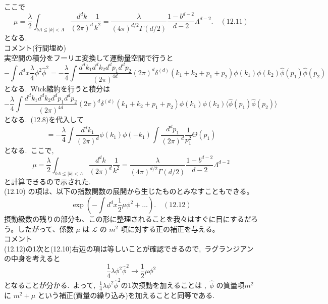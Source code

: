 \documentclass[uplatex,dvipdfmx]{jsarticle}
\begin{document}
ここで
\begin{equation}
    \mu = \frac{\lambda}{2} \int_{b\Lambda \le |k| < \Lambda} \frac{d^d k}{(2\pi)^d} \frac{1}{k^2} = \frac{\lambda}{(4\pi)^{d/2} \Gamma(d/2)} \frac{1 - b^{d-2}}{d-2} \Lambda^{d-2}. \quad (12.11)
\end{equation}
となる.\\
コメント(行間埋め)\\
実空間の積分をフーリエ変換して運動量空間で行うと
\begin{equation}
    - \int d^d x \frac{\lambda}{4} \phi^2 \hat{\phi}^2 = -\frac{\lambda}{4} \int \frac{d^d k_1 d^d k_2 d^d p_1 d^d p_2}{(2\pi)^{4d}} (2\pi)^d \delta^{(d)}(k_1+k_2+p_1+p_2) \phi(k_1)\phi(k_2)\hat{\phi}(p_1)\hat{\phi}(p_2)
\end{equation}
となる.~Wick縮約を行うと積分は
\begin{equation}
    -\frac{\lambda}{4} \int \frac{d^d k_1 d^d k_2 d^d p_1 d^d p_2}{(2\pi)^{4d}} (2\pi)^d \delta^{(d)}(k_1+k_2+p_1+p_2) \phi(k_1)\phi(k_2) \langle \hat{\phi}(p_1) \hat{\phi}(p_2) \rangle
\end{equation}
となる.~(12.8)を代入して
\begin{equation}
    = -\frac{\lambda}{4} \int \frac{d^d k_1}{(2\pi)^d} \phi(k_1)\phi(-k_1) \int \frac{d^d p_1}{(2\pi)^d} \frac{1}{p_1^2} \Theta(p_1)
\end{equation}
となる.~ここで,~
\begin{equation}
    \mu = \frac{\lambda}{2} \int_{b\Lambda \le |k| < \Lambda} \frac{d^d k}{(2\pi)^d} \frac{1}{k^2} = \frac{\lambda}{(4\pi)^{d/2} \Gamma(d/2)} \frac{1 - b^{d-2}}{d-2} \Lambda^{d-2}
\end{equation}
と計算できるので示された.\\
(12.10) の項は、以下の指数関数の展開から生じたものとみなすこともできる。
\begin{equation}
    \exp\left( - \int d^d x \frac{1}{2}\mu \phi^2 + \dots \right). \quad (12.12)
\end{equation}
摂動級数の残りの部分も、この形に整理されることを我々はすぐに目にするだろう。したがって、係数 $\mu$ は $\mathcal{L}$ の $m^2$ 項に対する正の補正を与える。\\
コメント\\
(12.12)の1次と(12.10)右辺の項は等しいことが確認できるので,~ラグランジアンの中身を考えると
\begin{equation}
    \frac{1}{4} \lambda \phi^2 \hat{\phi}^2 \to  \frac{1}{2} \mu \phi^2
\end{equation}
となることが分かる.~よって,~$\frac{1}{4} \lambda \phi^2 \hat{\phi}^2$の1次摂動を加えることは ,~$\hat{\phi}$ の質量項$m^2$に $m^2 + \mu$ という補正(質量の繰り込み)を加えることと同等である.\\
\end{document}
